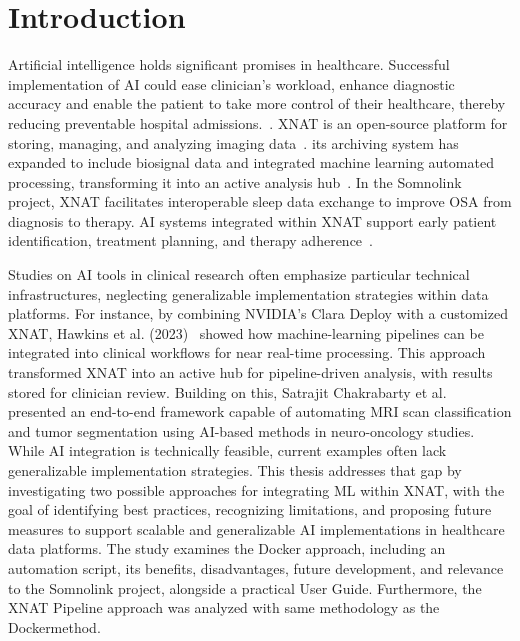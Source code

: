 

\chapter{Introduction}

Artificial intelligence holds significant promises in healthcare. Successful implementation of \ac{AI} could ease clinician's workload, enhance diagnostic accuracy and enable the patient to take more control of their healthcare, thereby reducing preventable hospital admissions.~\cite{aung_promise_2021}. XNAT is an open-source platform for storing, managing, and analyzing imaging data~\cite{xnat_implemetation.php}. its archiving system has expanded to include biosignal data and integrated machine learning automated processing, transforming it into an active analysis hub~\cite{marcus_extensible_2007}. In the Somnolink project, XNAT facilitates interoperable sleep data exchange to improve \ac{OSA} from diagnosis to therapy. AI systems integrated within XNAT support early patient identification, treatment planning, and therapy  adherence~\cite{SOMNOLINK}.

Studies on AI tools in clinical research often emphasize particular technical infrastructures, neglecting generalizable implementation strategies within data platforms. For instance, by combining NVIDIA’s Clara Deploy with a customized XNAT, Hawkins et al. (2023)~\cite{hawkins_implementation_2023} showed how machine-learning pipelines can be integrated into clinical workflows for near real-time processing. This approach transformed XNAT into an active hub for pipeline-driven analysis, with results stored for clinician review. Building on this, Satrajit Chakrabarty et al.~\cite{chakrabarty_deep_2023} presented an end-to-end framework capable of automating \ac{MRI} scan classification and tumor segmentation using AI-based methods in neuro-oncology studies.
While AI integration is technically feasible, current examples often lack generalizable implementation strategies. This thesis addresses that gap by investigating two possible approaches for integrating \ac{ML} within XNAT, with the goal of identifying best practices, recognizing limitations, and proposing future measures to support scalable and generalizable AI implementations in healthcare data platforms. The study examines the Docker approach, including an automation script, its benefits, disadvantages, future development, and relevance to the Somnolink project, alongside a practical User Guide. Furthermore, the XNAT Pipeline approach was analyzed with same methodology as the Dockermethod.






 

